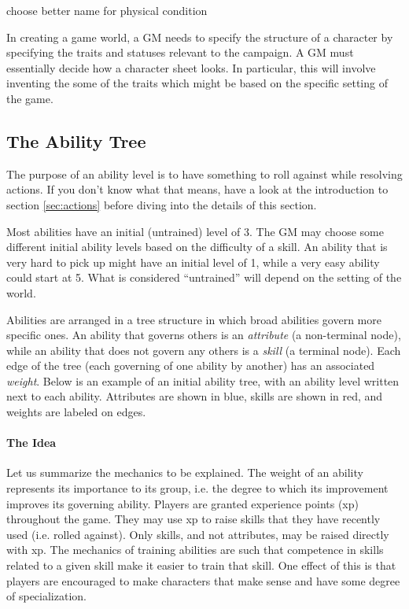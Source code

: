 \documentclass[12pt]{article}
\newcommand{\notes}[1]{{\color{Tan} #1}}
\begin{document}
\notes{choose better name for physical condition}



In creating a game world, a GM needs to specify the structure of a character by specifying the traits and statuses relevant to the campaign.
A GM must essentially decide how a character sheet looks.
In particular, this will involve inventing the some of the traits which might be based on the specific setting of the game.

\subsection{The Ability Tree}\label{sec:tree}			

The purpose of an ability level is to have something to roll against while resolving actions. If you don't know what that means, have a look at the introduction to section \ref{sec:actions} before diving into the details of this section.

Most abilities have an initial (untrained) level of 3. The GM may choose some different initial ability levels based on the difficulty of a skill. An ability that is very hard to pick up might have an initial level of 1, while a very easy ability could start at 5. What is considered ``untrained'' will depend on the setting of the world.

Abilities are arranged in a tree structure in which broad abilities govern more specific ones.
An ability that governs others is an \emph{attribute} (a non-terminal node), while an ability that does not govern any others is a \emph{skill} (a terminal node).
Each edge of the tree (each governing of one ability by another) has an associated \emph{weight}.
Below is an example of an initial ability tree, with an ability level written next to each ability.
Attributes are shown in blue, skills are shown in red, and weights are labeled on edges.

\begin{center}

\end{center}

\paragraph{The Idea} Let us summarize the mechanics to be explained. The weight of an ability represents its importance to its group, i.e. the degree to which its improvement improves its governing ability.
Players are granted experience points (xp) throughout the game. They may use xp to raise skills that they have recently used (i.e. rolled against).
Only skills, and not attributes, may be raised directly with xp.
The mechanics of training abilities are such that competence in skills related to a given skill make it easier to train that skill.
One effect of this is that players are encouraged
to make characters that make sense and have some degree of specialization.
\end{document}
